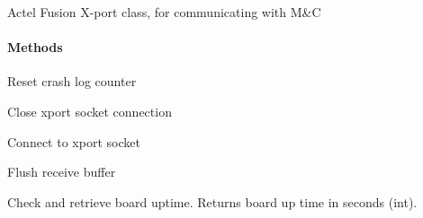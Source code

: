 \documentclass[letterpaper,10pt,english]{sphinxmanual}
\begin{document}

\begin{fulllineitems}
\label{index:xport.Xport}
Actel Fusion X-port class, for communicating with M\&C
\paragraph{Methods}


\begin{fulllineitems}
\label{index:xport.Xport.clear_crashlog}
Reset crash log counter

\end{fulllineitems}



\begin{fulllineitems}
\label{index:xport.Xport.close}
Close xport socket connection

\end{fulllineitems}



\begin{fulllineitems}
\label{index:xport.Xport.connect}
Connect to xport socket

\end{fulllineitems}



\begin{fulllineitems}
\label{index:xport.Xport.flush}
Flush receive buffer

\end{fulllineitems}



\begin{fulllineitems}
\label{index:xport.Xport.get_board_time}
Check and retrieve board uptime. Returns board up time in seconds (int).

\end{fulllineitems}



\end{fulllineitems}
\end{document}
